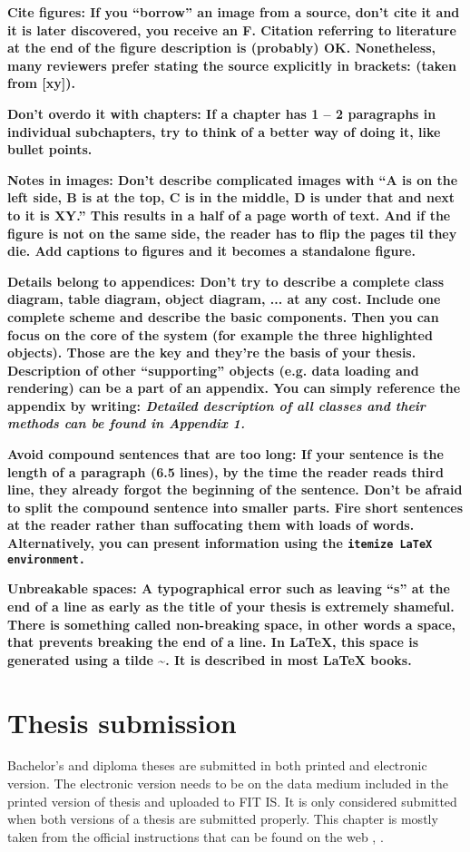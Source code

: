 \bf Cite figures: \rm If you ``borrow'' an image from a source, don't cite it and it is later discovered, you receive an F. Citation referring to literature at the end of the figure description is (probably) OK. Nonetheless, many reviewers prefer stating the source explicitly in brackets: (taken from [xy]).

\bf Don't overdo it with chapters: \rm If a chapter has 1 -- 2 paragraphs in individual subchapters, try to think of a better way of doing it, like bullet points.

\bf Notes in images: \rm Don't describe complicated images with ``A is on the left side, B is at the top, C is in the middle, D is under that and next to it is XY.'' This results in a half of a page worth of text. And if the figure is not on the same side, the reader has to flip the pages til they die. Add captions to figures and it becomes a standalone figure.

\bf Details belong to appendices: \rm Don't try to describe a complete class diagram, table diagram, object diagram, ... at any cost. Include one complete scheme and describe the basic components. Then you can focus on the core of the system (for example the three highlighted objects). Those are the key and they're the basis of your thesis. Description of other ``supporting'' objects (e.g. data loading and rendering) can be a part of an appendix. You can simply reference the appendix by writing: \it Detailed description of all classes and their methods can be found in Appendix 1. \rm

\bf Avoid compound sentences that are too long: \rm If your sentence is the length of a paragraph (6.5 lines), by the time the reader reads third line, they already forgot the beginning of the sentence. Don't be afraid to split the compound sentence into smaller parts. Fire short sentences at the reader rather than suffocating them with loads of words. Alternatively, you can present information using the \tt itemize \rm LaTeX environment.

\bf Unbreakable spaces: \rm A typographical error such as leaving ``s'' at the end of a line as early as the title of your thesis is extremely shameful. There is something called non-breaking space, in other words a space, that prevents breaking the end of a line. In LaTeX, this space is generated using a tilde \textasciitilde. It is described in most \LaTeX{} books.

\chapter{Thesis submission}
\label{odevzdani}
Bachelor's and diploma theses are submitted in both printed and electronic version. The electronic version needs to be on the data medium included in the printed version of thesis and uploaded to FIT IS. It is only considered submitted when both versions of a thesis are submitted properly. This chapter is mostly taken from the official instructions that can be found on the web \cite{formalniBP}, \cite{formalniDP}.

